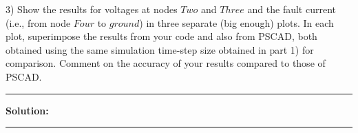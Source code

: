 3) Show the results for voltages at nodes $Two$ and $Three$ and the fault current (i.e., from node $Four$ to $ground$) in three separate (big enough) plots. In each plot, superimpose the results from your code and also from PSCAD, both obtained using the same simulation time-step size obtained in part 1) for comparison. Comment on the accuracy of your results compared to those of PSCAD.

\noindent\rule{\textwidth}{0.4pt}

\vspace{1em}

\textbf{Solution:}


\vspace{1em}
\noindent\rule{\textwidth}{0.4pt}